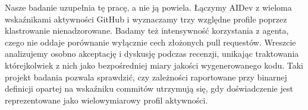 Nasze badanie uzupełnia tę pracę, a nie ją powiela. Łączymy AIDev z wieloma wskaźnikami aktywności GitHub i wyznaczamy trzy względne profile poprzez klastrowanie nienadzorowane. Badamy też intensywność korzystania z agenta, czego nie oddaje porównanie wyłącznie cech złożonych pull requestów. Wreszcie analizujemy osobno akceptację i dyskusję podczas recenzji, unikając traktowania którejkolwiek z nich jako bezpośredniej miary jakości wygenerowanego kodu. Taki projekt badania pozwala sprawdzić, czy zależności raportowane przy binarnej definicji opartej na wskaźniku commitów utrzymują się, gdy doświadczenie jest reprezentowane jako wielowymiarowy profil aktywności.
